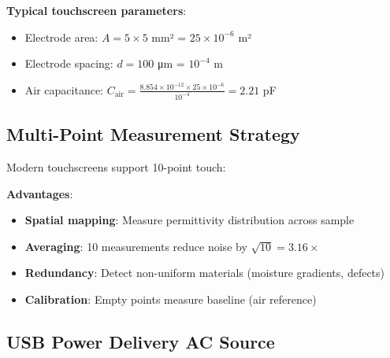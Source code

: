 \documentclass[12pt,a4paper]{article}
\begin{document}
\textbf{Typical touchscreen parameters}:
\begin{itemize}
\item Electrode area: $A = 5 \times 5$ mm² = $25 \times 10^{-6}$ m²
\item Electrode spacing: $d = 100$ μm = $10^{-4}$ m
\item Air capacitance: $C_{\text{air}} = \frac{8.854 \times 10^{-12} \times 25 \times 10^{-6}}{10^{-4}} = 2.21$ pF
\end{itemize}

\subsection{Multi-Point Measurement Strategy}

Modern touchscreens support 10-point touch:

\begin{center}
\end{center}

\textbf{Advantages}:
\begin{itemize}
\item \textbf{Spatial mapping}: Measure permittivity distribution across sample
\item \textbf{Averaging}: 10 measurements reduce noise by $\sqrt{10} = 3.16\times$
\item \textbf{Redundancy}: Detect non-uniform materials (moisture gradients, defects)
\item \textbf{Calibration}: Empty points measure baseline (air reference)
\end{itemize}

\subsection{USB Power Delivery AC Source}
\end{document}
